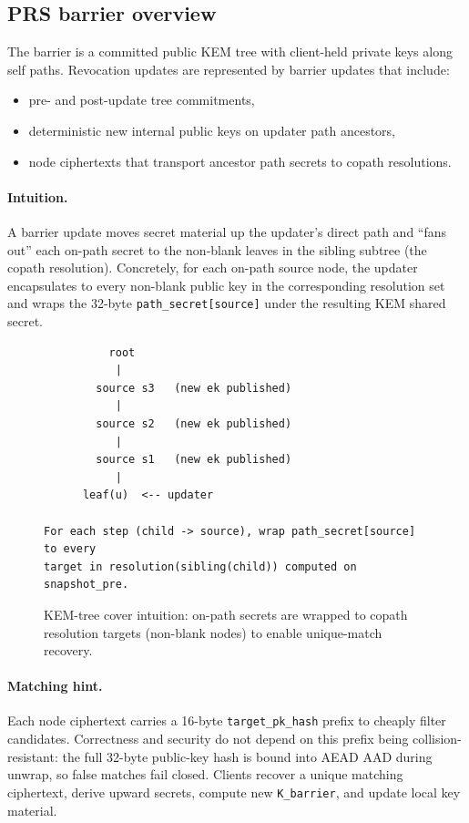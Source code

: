 \documentclass[11pt]{article}
\newcommand{\kbarrier}{\texttt{K\_barrier}}
\begin{document}
\subsection{PRS barrier overview}
The barrier is a committed public KEM tree with client-held private keys along self paths. Revocation updates are represented by barrier updates that include:
\begin{itemize}
  \item pre- and post-update tree commitments,
  \item deterministic new internal public keys on updater path ancestors,
  \item node ciphertexts that transport ancestor path secrets to copath resolutions.
\end{itemize}
\paragraph{Intuition.}
A barrier update moves secret material up the updater's direct path and ``fans out'' each on-path secret to the non-blank leaves in the sibling subtree (the copath resolution). Concretely, for each on-path source node, the updater encapsulates to every non-blank public key in the corresponding resolution set and wraps the 32-byte \texttt{path\_secret[source]} under the resulting KEM shared secret.

\begin{figure}[t]
\centering
\begin{minipage}{0.92\linewidth}
\small
\begin{verbatim}
          root
           |
        source s3   (new ek published)
           |
        source s2   (new ek published)
           |
        source s1   (new ek published)
           |
      leaf(u)  <-- updater

For each step (child -> source), wrap path_secret[source] to every
target in resolution(sibling(child)) computed on snapshot_pre.
\end{verbatim}
\end{minipage}
\caption{KEM-tree cover intuition: on-path secrets are wrapped to copath
resolution targets (non-blank nodes) to enable unique-match recovery.}
\end{figure}

\paragraph{Matching hint.}
Each node ciphertext carries a 16-byte \texttt{target\_pk\_hash} prefix to cheaply filter candidates. Correctness and security do not depend on this prefix being collision-resistant: the full 32-byte public-key hash is bound into AEAD AAD during unwrap, so false matches fail closed.
Clients recover a unique matching ciphertext, derive upward secrets, compute new \kbarrier, and update local key material.
\end{document}
